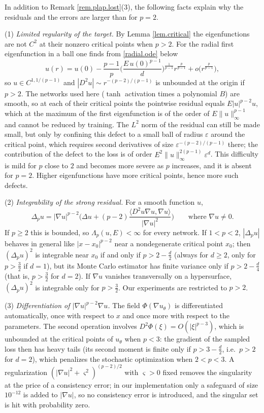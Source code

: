 \begin{remark}\label{rem.plap.errors}
In addition to Remark \ref{rem.plap.lost}(3), the following facts explain why the
residuals and the errors are larger than for $p=2$.

(1) \emph{Limited regularity of the target.} By Lemma \ref{lem.critical} the
eigenfunctions are not $C^2$ at their nonzero critical points when $p>2$. For the radial
first eigenfunction in a ball one finds from \eqref{radial.ode} below
\[
u(r)=u(0)-\frac{p-1}{p}\Big(\frac{E\,u(0)^{p-1}}{d}\Big)^{\frac1{p-1}}r^{\frac p{p-1}}+o\big(r^{\frac p{p-1}}\big),
\]
so $u\in C^{1,1/(p-1)}$ and $|D^2u|\sim r^{-(p-2)/(p-1)}$ is unbounded at the origin if
$p>2$. The networks used here ($\tanh$ activation times a polynomial $B$) are smooth, so
at each of their critical points the pointwise residual equals $E|u|^{p-2}u$, which at
the maximum of the first eigenfunction is of the order of $E\|u\|_\infty^{p-1}$ and
cannot be reduced by training. The $L^2$ norm of the residual can still be made small,
but only by confining this defect to a small ball of radius $\varepsilon$ around the
critical point, which requires second derivatives of size
$\varepsilon^{-(p-2)/(p-1)}$ there; the contribution of the defect to the loss is of
order $E^2\|u\|_\infty^{2(p-1)}\varepsilon^{d}$. This difficulty is mild for $p$ close to
$2$ and becomes more severe as $p$ increases, and it is absent for $p=2$. Higher
eigenfunctions have more critical points, hence more such defects.

(2) \emph{Integrability of the strong residual.} For a smooth function $u$,
\[
\Delta_pu=|\nabla u|^{p-2}\Big(\Delta u+(p-2)\frac{\langle D^2u\nabla u,\nabla u\rangle}{|\nabla u|^2}\Big)
\qquad\text{where }\nabla u\ne0 .
\]
If $p\ge2$ this is bounded, so $\Lambda_p(u,E)<\infty$ for every network. If $1<p<2$,
$|\Delta_pu|$ behaves in general like $|x-x_0|^{p-2}$ near a nondegenerate critical point
$x_0$;
then $(\Delta_pu)^2$ is integrable near $x_0$ if and only if $p>2-\frac d2$ (always for
$d\ge2$, only for $p>\frac32$ if $d=1$), but its Monte Carlo estimator has finite variance
only if $p>2-\frac d4$ (that is, $p>\frac32$ for $d=2$). If $\nabla u$ vanishes
transversally on a hypersurface, $(\Delta_pu)^2$ is integrable only for $p>\frac32$.
Our experiments are restricted to $p>2$.

(3) \emph{Differentiation of $|\nabla u|^{p-2}\nabla u$.} The field
$\Phi(\nabla u_\theta)$ is differentiated automatically, once with respect to $x$ and
once more with respect to the parameters. The second operation involves
$D^2\Phi(\xi)=O(|\xi|^{p-3})$, which is unbounded at the critical points of $u_\theta$
when $p<3$: the gradient of the sampled loss then has heavy tails (its second moment is
finite only if $p>3-\frac d2$, i.e.\ $p>2$ for $d=2$), which penalizes the stochastic
optimization when $2<p<3$. A regularization
$(|\nabla u|^2+\varsigma^2)^{(p-2)/2}$ with $\varsigma>0$ fixed removes the singularity at
the price of a consistency error; in our implementation only a safeguard of size
$10^{-12}$ is added to $|\nabla u|$, so no consistency error is introduced, and the
singular set is hit with probability zero.


\end{remark}
